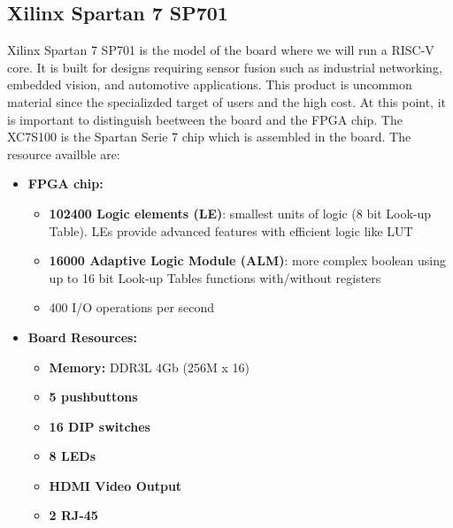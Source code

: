 \subsection{Xilinx Spartan 7 SP701} \label{sec:fpga}
Xilinx Spartan 7 SP701 is the model of the board where we will run a RISC-V core. It is built for designs requiring sensor fusion such as industrial networking, embedded vision, and automotive applications. This product is uncommon material since the specializded target of users and the high cost. At this point, it is important to distinguish beetween the board and the FPGA chip. The XC7S100  is the Spartan Serie 7 chip which is assembled in the board. The resource availble are: 

\begin{itemize}
	\item \textbf{FPGA chip:}
	\begin{itemize}
		\item \textbf{102400 Logic elements (LE)}: smallest units of logic (8 bit Look-up Table). LEs  provide advanced features with efficient logic like LUT
	   	\item \textbf{16000 Adaptive Logic Module (ALM)}: more complex boolean using up to 16 bit Look-up Tables functions with/without registers
	    	\item 400 I/O operations per second %
	\end{itemize}
	\item \textbf{Board  Resources:}
	\begin{itemize}
		\item \textbf{Memory:} DDR3L 4Gb (256M x 16)
		\item \textbf{5 pushbuttons}
		\item \textbf{16 DIP switches}
		\item \textbf{8 LEDs}
		\item \textbf{HDMI Video Output}
		\item \textbf{2 RJ-45}
		
	\end{itemize}
\end{itemize}
